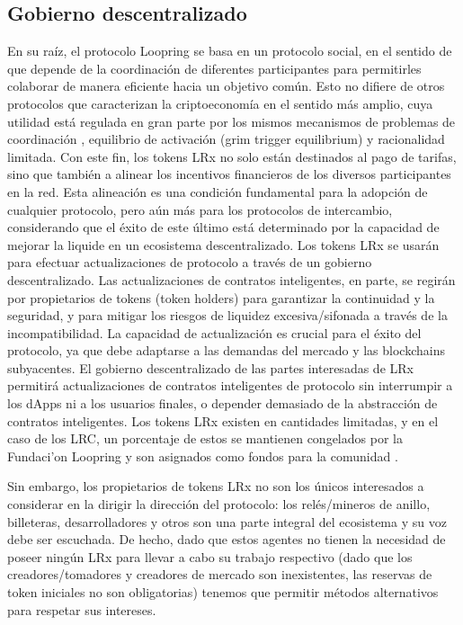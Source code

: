 \documentclass[UTF8,nofonts]{article}
\begin{document}
\begin{multicols}{2}
\subsection{Gobierno descentralizado}
En su ra\'iz, el protocolo Loopring se basa en un protocolo social, en el sentido de que depende de la coordinaci\'on de diferentes participantes para permitirles colaborar de manera eficiente hacia un objetivo com\'un. Esto no difiere de otros protocolos que caracterizan la criptoeconom\'ia en el sentido m\'as amplio, cuya utilidad est\'a regulada en gran parte por los mismos mecanismos de problemas de coordinaci\'on \cite{vitalikgovernance}, equilibrio de activaci\'on (grim trigger equilibrium) y racionalidad limitada. Con este fin, los tokens LRx no solo est\'an destinados al pago de tarifas, sino que tambi\'en a alinear los incentivos financieros de los diversos participantes en la red. Esta alineaci\'on es una condici\'on fundamental para la adopci\'on de cualquier protocolo, pero a\'un m\'as para los protocolos de intercambio, considerando que el \'exito de este \'ultimo est\'a determinado por la capacidad de mejorar la liquide en un ecosistema descentralizado. 
Los tokens LRx se usar\'an para efectuar actualizaciones de protocolo a trav\'es de un gobierno descentralizado. Las actualizaciones de contratos inteligentes, en parte, se regir\'an por propietarios de tokens (token holders) para garantizar la continuidad y la seguridad, y para mitigar los riesgos de liquidez excesiva/sifonada a trav\'es de la incompatibilidad. La capacidad de actualizaci\'on es crucial para el \'exito del protocolo, ya que debe adaptarse a las demandas del mercado y las blockchains subyacentes. El gobierno descentralizado de las partes interesadas de LRx permitir\'a actualizaciones de contratos inteligentes de protocolo sin interrumpir a los dApps ni a los usuarios finales, o depender demasiado de la abstracci\'on de contratos inteligentes. Los tokens LRx existen en cantidades limitadas, y en el caso de los LRC, un porcentaje de estos se mantienen congelados por la Fundaci'on Loopring y son asignados como fondos para la comunidad \cite{LRCtokendoc}.

Sin embargo, los propietarios de tokens LRx no son los \'unicos interesados a considerar en la dirigir la direcci\'on del protocolo: los rel\'es/mineros de anillo, billeteras, desarrolladores y otros son una parte integral del ecosistema y su voz debe ser escuchada. De hecho, dado que estos agentes no tienen la necesidad de poseer ning\'un LRx para llevar a cabo su trabajo respectivo (dado que los creadores/tomadores y creadores de mercado son inexistentes, las reservas de token iniciales no son obligatorias) tenemos que permitir m\'etodos alternativos para respetar sus intereses.



\end{multicols}
\end{document}
